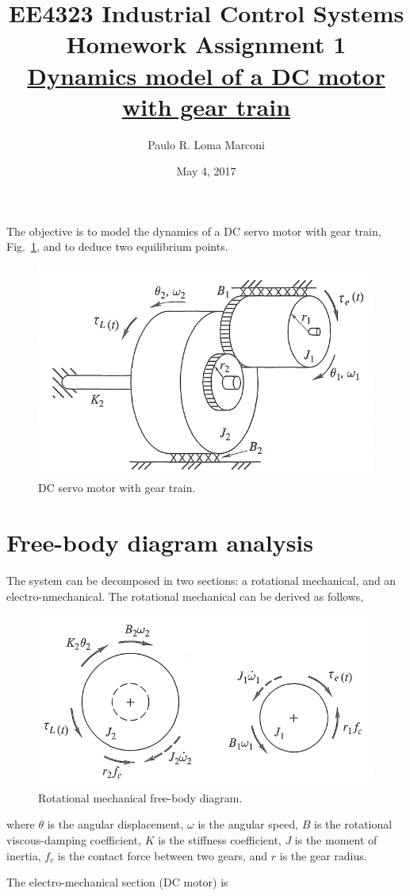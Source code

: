 \documentclass[]{article}
\title{EE4323 Industrial Control Systems\\ 
		Homework Assignment 1\\
		\underline{Dynamics model of a DC motor with gear train}}
\author{Paulo R. Loma Marconi}
\date{May 4, 2017}
\newcommand{\figref}[1]{Fig.~\ref{#1}}
\begin{document}
\maketitle

The objective is to model the dynamics of a DC servo motor with gear train, \figref{fig:DCmotor}, and to deduce two equilibrium points.

\begin{figure}[!ht]
	\centering
	\includegraphics[width=0.5\linewidth]{DCmotor}
	\caption{DC servo motor with gear train.}
	\label{fig:DCmotor}
\end{figure}

\section{Free-body diagram analysis}
The system can be decomposed in two sections: a rotational mechanical, and an electro-nmechanical. The rotational mechanical can be derived as follows,

\begin{figure}[H]
	\centering
	\includegraphics[width=0.5\linewidth]{Rotational_free-body}
	\caption{Rotational mechanical free-body diagram.}
	\label{fig:rotational_free-body}
\end{figure}
where $\theta$ is the angular displacement, $\omega$ is the angular speed, $B$ is the rotational viscous-damping coefficient, $K$ is the stiffness coefficient, $J$ is the moment of inertia, $f_c$ is the contact force between two gears, and $r$ is the gear radius.

The electro-mechanical section (DC motor) is
\end{document}
